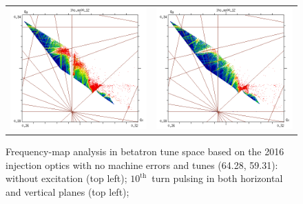 \documentclass[%
 reprint,
 amsmath,amssymb,
 aps,
prstab,
longbibliography
]{revtex4-1}
\newlength{\fmawidth}
\begin{document}
\begin{figure}
\begin{tabular}{cc}
    \includegraphics[width=\fmawidth]{2016injnocolc15o+19_6noerrut7skh_dp0_ord7.png} &
    \includegraphics[width=\fmawidth]{2016injnocolc15o+19_6noerrut7skv_dp0_ord7.png} \\
  \end{tabular}
  \caption{Frequency-map analysis in betatron tune space based on the
    2016 injection optics with no machine errors and tunes (64.28,
    59.31): without excitation (top left); $10^{\mathrm{th}}$~turn
    pulsing in both horizontal and vertical planes (top left);
}
\end{figure}
\end{document}
